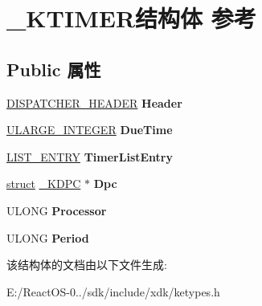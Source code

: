 \hypertarget{struct___k_t_i_m_e_r}{}\section{\+\_\+\+K\+T\+I\+M\+E\+R结构体 参考}
\label{struct___k_t_i_m_e_r}
\subsection*{Public 属性}
\begin{DoxyCompactItemize}
\item 
\mbox{\label{struct___k_t_i_m_e_r_af5b350937d55130f094bee2dce55865c}} 
\hyperlink{struct___d_i_s_p_a_t_c_h_e_r___h_e_a_d_e_r}{D\+I\+S\+P\+A\+T\+C\+H\+E\+R\+\_\+\+H\+E\+A\+D\+ER} {\bfseries Header}
\item 
\mbox{\label{struct___k_t_i_m_e_r_ad23ff37755d7c7b081ac48c82e89812d}} 
\hyperlink{struct___u_l_a_r_g_e___i_n_t_e_g_e_r}{U\+L\+A\+R\+G\+E\+\_\+\+I\+N\+T\+E\+G\+ER} {\bfseries Due\+Time}
\item 
\mbox{\label{struct___k_t_i_m_e_r_af98f7b6061977a2684709ffc9fa62242}} 
\hyperlink{struct___l_i_s_t___e_n_t_r_y}{L\+I\+S\+T\+\_\+\+E\+N\+T\+RY} {\bfseries Timer\+List\+Entry}
\item 
\mbox{\label{struct___k_t_i_m_e_r_a842d089deb7b981f991bd412909ef5dd}} 
\hyperlink{interfacestruct}{struct} \hyperlink{struct___k_d_p_c}{\+\_\+\+K\+D\+PC} $\ast$ {\bfseries Dpc}
\item 
\mbox{\label{struct___k_t_i_m_e_r_a9600f9532f40ec9c17e6e8090977152e}} 
U\+L\+O\+NG {\bfseries Processor}
\item 
\mbox{\label{struct___k_t_i_m_e_r_af210ce093778db5b96f8251d905e9400}} 
U\+L\+O\+NG {\bfseries Period}
\end{DoxyCompactItemize}


该结构体的文档由以下文件生成\+:\begin{DoxyCompactItemize}
\item 
E\+:/\+React\+O\+S-\/0../sdk/include/xdk/ketypes.\+h\end{DoxyCompactItemize}
